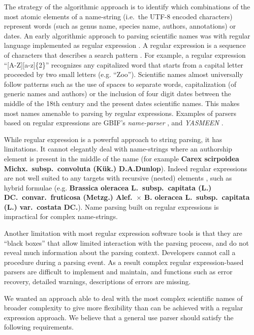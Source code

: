 \documentclass{bmcart}
\begin{document}
The strategy of the algorithmic approach is to identify which combinations of
the most atomic elements of a name-string (i.e.\ the UTF-8 encoded characters)
represent words (such as genus name, species name, authors, annotations) or
dates. An early algorithmic approach to parsing scientific names was with
regular language implemented as regular expression \cite{Leary2007}. A regular
expression is a sequence of characters that describes a search pattern
\cite{aho1992foundations}. For example, a regular expression
``[A-Z][a-z]\{2\}'' recognizes any capitalized word that starts from a capital
letter proceeded by two small letters (e.g. ``Zoo''). Scientific names almost
universally follow patterns such as the use of spaces to separate words,
capitalization (of generic names and authors) or the inclusion of four digit
dates between the middle of the 18th century and the present dates scientific
names. This makes most names amenable to parsing by regular expressions.
Examples of parsers based on regular expressions are GBIF's
\textit{name-parser} \cite{gbifNameParser}, and \textit{YASMEEN}
\cite{VandenBerghe2015}.

While regular expression is a powerful approach to string parsing, it has
limitations. It cannot elegantly deal with name-strings where an authorship
element is present in the middle of the name (for example \textbf{Carex
scirpoidea Michx.\ subsp.\ convoluta (Kük.) D.A.Dunlop}). Indeed regular
expressions are not well suited to any targets with recursive (nested) elements
\cite{yu1997handbook}, such as hybrid formulae (e.g. \textbf{Brassica oleracea
L.\ subsp.\ capitata (L.) DC.\ convar.\ fruticosa (Metzg.) Alef.\ $\times$ B.
oleracea L.\ subsp.\ capitata (L.) var.\ costata DC.}). Name parsing built on
regular expressions is impractical for complex name-strings.

Another limitation with most regular expression software tools is that they are
``black boxes'' that allow limited interaction with the parsing process, and do
not reveal much information about the parsing context. Developers cannot call a
procedure during a parsing event. As a result complex regular expression-based
parsers are difficult to implement and maintain, and functions such as error
recovery, detailed warnings, descriptions of errors are missing.

We wanted an approach able to deal with the most complex scientific names of
broader complexity to give more flexibility than can be achieved with a regular
expression approach. We believe that a general use parser should satisfy the
following requirements.
\end{document}
